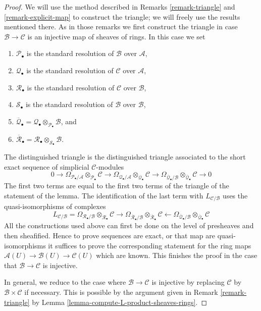\documentclass{stacks-project}
\theoremstyle{plain}
\theoremstyle{definition}
\theoremstyle{remark}
\numberwithin{equation}{subsection}
\begin{document}
\begin{proof}
We will use the method described in
Remarks \ref{remark-triangle} and \ref{remark-explicit-map}
to construct the triangle; we will freely use the results mentioned there.
As in those remarks we first construct the triangle in case
$\mathcal{B} \to \mathcal{C}$ is an injective map of sheaves of rings.
In this case we set
\begin{enumerate}
\item $\mathcal{P}_\bullet$ is the standard resolution of $\mathcal{B}$
over $\mathcal{A}$,
\item $\mathcal{Q}_\bullet$ is the standard resolution of $\mathcal{C}$
over $\mathcal{A}$,
\item $\mathcal{R}_\bullet$ is the standard resolution of $\mathcal{C}$
over $\mathcal{B}$,
\item $\mathcal{S}_\bullet$ is the standard resolution of $\mathcal{B}$
over $\mathcal{B}$,
\item $\overline{\mathcal{Q}}_\bullet =
\mathcal{Q}_\bullet \otimes_{\mathcal{P}_\bullet} \mathcal{B}$, and
\item $\overline{\mathcal{R}}_\bullet =
\mathcal{R}_\bullet \otimes_{\mathcal{S}_\bullet} \mathcal{B}$.
\end{enumerate}
The distinguished triangle is the distinguished triangle associated
to the short exact sequence
of simplicial $\mathcal{C}$-modules
$$
0 \to
\Omega_{\mathcal{P}_\bullet/\mathcal{A}}
\otimes_{\mathcal{P}_\bullet} \mathcal{C} \to
\Omega_{\mathcal{Q}_\bullet/\mathcal{A}}
\otimes_{\mathcal{Q}_\bullet} \mathcal{C} \to
\Omega_{\overline{\mathcal{Q}}_\bullet/\mathcal{B}}
\otimes_{\overline{\mathcal{Q}}_\bullet} \mathcal{C} \to 0
$$
The first two terms are equal to the first two terms of the triangle
of the statement of the lemma. The identification of the last term with
$L_{\mathcal{C}/\mathcal{B}}$ uses the quasi-isomorphisms of complexes
$$
L_{\mathcal{C}/\mathcal{B}} =
\Omega_{\mathcal{R}_\bullet/\mathcal{B}}
\otimes_{\mathcal{R}_\bullet} \mathcal{C}
\longrightarrow
\Omega_{\overline{\mathcal{R}}_\bullet/\mathcal{B}}
\otimes_{\overline{\mathcal{R}}_\bullet} \mathcal{C}
\longleftarrow
\Omega_{\overline{\mathcal{Q}}_\bullet/\mathcal{B}}
\otimes_{\overline{\mathcal{Q}}_\bullet} \mathcal{C}
$$
All the constructions used above can first be done on the level
of presheaves and then sheafified. Hence to prove sequences are exact,
or that map are quasi-isomorphisms it suffices to prove the corresponding
statement for the ring maps
$\mathcal{A}(U) \to \mathcal{B}(U) \to \mathcal{C}(U)$
which are known. This finishes the proof in the case that
$\mathcal{B} \to \mathcal{C}$ is injective.

\medskip\noindent
In general, we reduce to the case where $\mathcal{B} \to \mathcal{C}$ is
injective by replacing $\mathcal{C}$ by $\mathcal{B} \times \mathcal{C}$ if
necessary. This is possible by the argument given in
Remark \ref{remark-triangle} by
Lemma \ref{lemma-compute-L-product-sheaves-rings}.
\end{proof}
\end{document}

